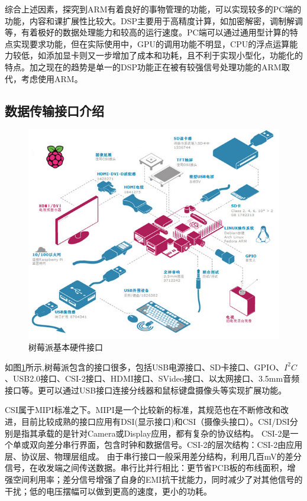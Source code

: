 综合上述因素，探究到ARM有着良好的事物管理的功能，可以实现较多的PC端的功能，内容和课扩展性比较大。DSP主要用于高精度计算，如加密解密，调制解调等，有着极好的数据处理能力和较高的运行速度。PC端可以通过通用型计算的特点实现要求功能，但在实际使用中，GPU的调用功能不明显，CPU的浮点运算能力较低，如添加显卡则又一步增加了成本和功耗，且不利于实现小型化，功能化的特点。加之现在的趋势是单一的DSP功能正在被有较强信号处理功能的ARM取代，考虑使用ARM。



\subsection{数据传输接口介绍}

\begin{figure}[h]
	\centering
	\includegraphics[width=0.7\linewidth]{Figure/rasp_all}
	\caption{树莓派基本硬件接口}
	\label{fig:rasp_1}
\end{figure}

如图\ref{fig:rasp_1}所示,树莓派包含的接口很多，包括USB电源接口、SD卡接口、GPIO、$I^{2}C$、USB2.0接口、CSI-2接口、HDMI接口、SVideo接口、以太网接口、3.5mm音频接口等。更可以通过USB接口连接分线器和鼠标键盘摄像头等实现扩展功能\cite{IoT}。

CSI属于MIPI标准之下。MIPI是一个比较新的标准，其规范也在不断修改和改进，目前比较成熟的接口应用有DSI(显示接口)和CSI（摄像头接口）。CSI/DSI分别是指其承载的是针对Camera或Display应用，都有复杂的协议结构。
CSI-2是一个单或双向差分串行界面，包含时钟和数据信号。CSI-2的层次结构：CSI-2由应用层、协议层、物理层组成。
由于串行接口一般采用差分结构，利用几百mV的差分信号，在收发端之间传送数据。串行比并行相比：更节省PCB板的布线面积，增强空间利用率；差分信号增强了自身的EMI抗干扰能力，同时减少了对其他信号的干扰；低的电压摆幅可以做到更高的速度，更小的功耗。

